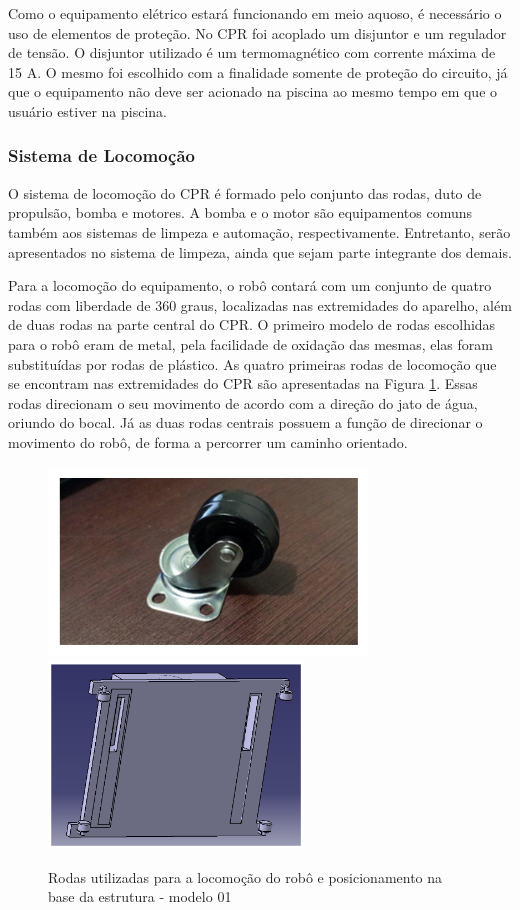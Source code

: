 Como o equipamento elétrico estará funcionando em meio aquoso, é necessário
o uso de  elementos de proteção. No CPR foi acoplado um disjuntor e um
regulador de tensão. O disjuntor utilizado é um termomagnético com corrente
máxima de 15 A. O mesmo foi escolhido com a finalidade somente de proteção
do circuito, já que o equipamento não deve ser acionado na piscina ao
mesmo tempo em que o usuário estiver na piscina. 

\subsubsection{Sistema de Locomoção}
O sistema de locomoção do CPR é formado pelo conjunto das rodas, duto de
propulsão, bomba e motores. A bomba e o motor são equipamentos comuns também
aos  sistemas de limpeza e automação, respectivamente. Entretanto, serão
apresentados no sistema de limpeza, ainda que sejam parte integrante dos demais.

Para a locomoção do equipamento, o robô contará com um conjunto de quatro
rodas com liberdade de 360 graus, localizadas nas extremidades do aparelho,
além de duas rodas na parte central do CPR. O primeiro modelo de rodas
escolhidas para o robô eram de metal, pela facilidade de oxidação das mesmas,
elas foram substituídas por rodas de plástico. As quatro primeiras rodas de
locomoção que se encontram nas extremidades do CPR são apresentadas na
Figura \ref{fig:wheel-base}. Essas rodas direcionam o seu movimento de acordo
com a direção do jato de água, oriundo do bocal. Já as duas rodas centrais
possuem a função de direcionar o movimento do robô, de forma a percorrer
um caminho orientado.

\begin{figure}[h]
  \centering
	\includegraphics[height=5cm]{figuras/wheel-market.png}
	\quad
	\includegraphics[height=5cm]{figuras/catia-base.png}
  \caption{Rodas utilizadas para a locomoção do robô e posicionamento na base da estrutura - modelo 01}
  \label{fig:wheel-base}
\end{figure}
\FloatBarrier

